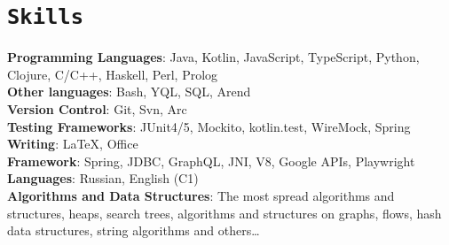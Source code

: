 \documentclass[letterpaper,10pt]{article}
\newcommand{\apricotColor}[1]{\colorbox{Apricot}{\texttt{#1}}}
\begin{document}
\section{\apricotColor{Skills}}
 \begin{itemize}[leftmargin=0.15in, label={}]
    \small{\item{
     \textbf{Programming Languages}{: Java, Kotlin, JavaScript, TypeScript, Python, Clojure, C/C++, Haskell, Perl, Prolog} \\
     \textbf{Other languages}{: Bash, YQL, SQL, Arend}\\
     \textbf{Version Control}{: Git, Svn, Arc} \\
     \textbf{Testing Frameworks}{: JUnit4/5, Mockito, kotlin.test, WireMock, Spring} \\
     \textbf{Writing}{: \LaTeX, Office} \\
     \textbf{Framework}{: Spring, JDBC, GraphQL, JNI, V8, Google APIs, Playwright} \\
     \textbf{Languages}{: Russian, English (C1)} \\
     \textbf{Algorithms and Data Structures}{: The most spread algorithms and structures, heaps, search trees, algorithms and structures on graphs, flows, hash data structures, string algorithms and others\dots} \\
    }}
 \end{itemize}
\end{document}

